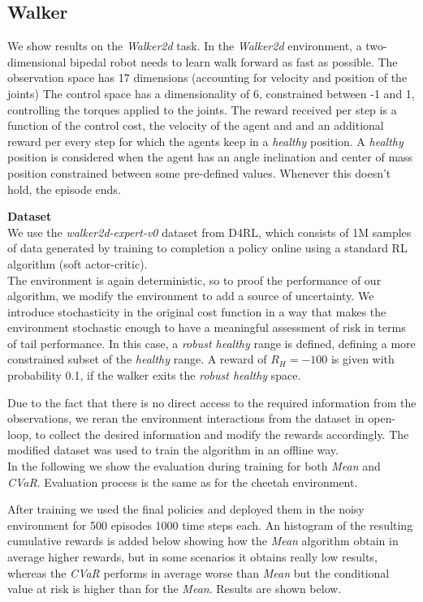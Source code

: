 \clearpage

\subsection{Walker}

We show results on the \textit{Walker2d} task.
In the \textit{Walker2d} environment, a two-dimensional bipedal robot needs to learn walk forward
as fast as possible.
The observation space has 17 dimensions (accounting for velocity and position of the joints)
The control space has a dimensionality of 6, constrained between -1 and 1, 
controlling the torques applied to the joints.
The reward received per step is a function of the control cost, the velocity of the agent and 
and an additional reward per every step for which the agents keep in a \textit{healthy} position.
A \textit{healthy} position is considered when the agent has an angle inclination and center of mass
position constrained between some pre-defined values. Whenever this doesn't hold, the episode ends.

\textbf{Dataset}\\
We use the \textit{walker2d-expert-v0} dataset from D4RL, which consists of 1M samples of data generated by
training to completion a policy online using a standard RL algorithm (soft actor-critic).\\
The environment is again deterministic, so to proof the performance of our algorithm, we modify the environment to
add a source of uncertainty. We introduce stochasticity in the original cost function in a way that 
makes the environment stochastic enough to have a meaningful assessment of risk in terms of 
tail performance.
In this case, a \textit{robust healthy} range is defined, defining a more constrained subset of the \textit{healthy} range.
A reward of $R_H=-100$ is given with probability 0.1, if the walker exits the \textit{robust healthy} space.

Due to the fact that there is no direct access to the required information from the observations,
we reran the environment interactions from the dataset in open-loop, to collect the desired information and 
modify the rewards accordingly.
The modified dataset was used to train the algorithm in an offline way.\\


In the following we show the evaluation during training for both \textit{Mean} and
\textit{CVaR}.
Evaluation process is the same as for the cheetah environment.

After training we used the final policies and deployed them in the noisy environment for 500 episodes 
1000 time steps each. An histogram of the resulting cumulative rewards is added below showing
how the \textit{Mean} algorithm obtain in average higher rewards, but in some scenarios it 
obtains really low results, whereas the \textit{CVaR} performs in average worse than \textit{Mean} 
but the conditional value at risk is higher than for the \textit{Mean}.
Results are shown below.


